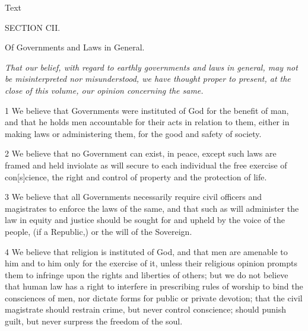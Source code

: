 			
			\begin{description}
				\item[Text]
			\end{description}
			
				\begin{tightcenter}
					SECTION CII.
				
					Of Governments and Laws in General.
				\end{tightcenter}
				
				\textit{That our belief, with regard to earthly governments and laws in general, may not be misinterpreted nor misunderstood, we have thought proper to present, at the close of this volume, our opinion concerning the same.}
				
				1 We believe that Governments were instituted of God for the benefit of man, and that he holds men accountable for their acts in relation to them, either in making laws or administering them, for the good and safety of society.
				
				2 We believe that no Government can exist, in peace, except such laws are framed and held inviolate as will secure to each individual the free exercise of con[s]cience, the right and control of property and the protection of life.

				3 We believe that all Governments necessarily require civil officers and magistrates to enforce the laws of the same, and that such as will administer the law in equity and justice should be sought for and upheld by the voice of the people, (if a Republic,) or the will of the Sovereign.

				4 We believe that religion is instituted of God, and that men are amenable to him and to him only for the exercise of it, unless their religious opinion prompts them to infringe upon the rights and liberties of others; but we do not believe that human law has a right to interfere in prescribing rules of worship to bind the consciences of men, nor dictate forms for public or private devotion; that the civil magistrate should restrain crime, but never control conscience; should punish guilt, but never surpress the freedom of the soul.


